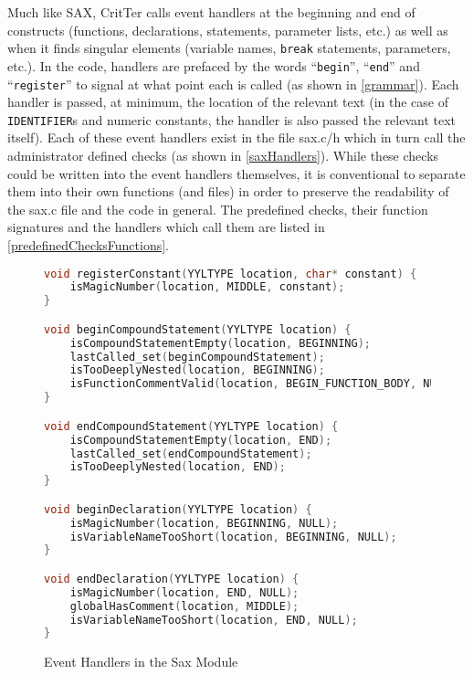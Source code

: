 \documentclass[12pt]{report}
\newcommand{\programName}{CritTer\xspace}
\begin{document}
Much like SAX, \programName calls event handlers at the beginning and end of constructs (functions, 
declarations, statements, parameter lists, etc.) as well as when it finds singular elements (variable 
names, \lstinline{break} statements, parameters, etc.). In the code, handlers are prefaced by the words 
``\lstinline{begin}'', ``\lstinline{end}'' and ``\lstinline{register}'' to signal at what point each is called (as 
shown in \autoref{grammar}). Each handler is passed, at minimum, the location of the relevant text (in 
the case of \lstinline{IDENTIFIER}s and numeric constants, the handler is also passed the relevant 
text itself). Each of these event handlers exist in the file sax.c/h which in turn call the administrator 
defined checks (as shown in \autoref{saxHandlers}). While these checks could be written into the event 
handlers themselves, it is conventional to separate them into their own functions (and files) in order to 
preserve the readability of the sax.c file and the code in general. The predefined checks, their function 
signatures and the handlers which call them are listed in \autoref{predefinedChecksFunctions}.

\begin{figure}
\begin{lstlisting}[language=C]
void registerConstant(YYLTYPE location, char* constant) {
	isMagicNumber(location, MIDDLE, constant);
}

void beginCompoundStatement(YYLTYPE location) {
	isCompoundStatementEmpty(location, BEGINNING);
	lastCalled_set(beginCompoundStatement);
	isTooDeeplyNested(location, BEGINNING);
	isFunctionCommentValid(location, BEGIN_FUNCTION_BODY, NULL);
}

void endCompoundStatement(YYLTYPE location) {
	isCompoundStatementEmpty(location, END);
	lastCalled_set(endCompoundStatement);
	isTooDeeplyNested(location, END);
}

void beginDeclaration(YYLTYPE location) {
	isMagicNumber(location, BEGINNING, NULL);
	isVariableNameTooShort(location, BEGINNING, NULL);
}

void endDeclaration(YYLTYPE location) {
	isMagicNumber(location, END, NULL);
	globalHasComment(location, MIDDLE);
	isVariableNameTooShort(location, END, NULL);
}
\end{lstlisting}
\caption{Event Handlers in the Sax Module}
\label{saxHandlers}
\end{figure}
\end{document}
